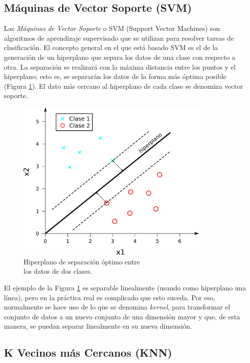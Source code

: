 \subsection{Máquinas de Vector Soporte (SVM)}

Las \textit{Máquinas de Vector Soporte} o SVM (Support Vector Machines) son algoritmos de aprendizaje supervisado que se utilizan para resolver tareas de clasificación. El concepto general en el que está basado SVM es el de la generación de un hiperplano que separa los datos de una clase con respecto a otra. La separación se realizará con la máxima distancia entre los puntos y el hiperplano; esto es, se separarán los datos de la forma más óptima posible (Figura \ref{fig:svm_hiperplano}). El dato más cercano al hiperplano de cada clase se denomina vector soporte.\\

\begin{figure} [h!]
  \begin{center}
    \includegraphics[width=95mm]{figs/svm_hiperplano.png}
  \end{center}
  \caption{Hiperplano de separación óptimo entre\\
            los datos de dos clases.}
  \label{fig:svm_hiperplano}
\end{figure}

El ejemplo de la Figura \ref{fig:svm_hiperplano} es separable linealmente (usando como hiperplano una línea), pero en la práctica real es complicado que esto suceda. Por eso, normalmente se hace uso de lo que se denomina \textit{kernel}, para transformar el conjunto de datos a un nuevo conjunto de una dimensión mayor y que, de esta manera, se puedan separar linealmente en su nueva dimensión.

\subsection{K Vecinos más Cercanos (KNN)}

